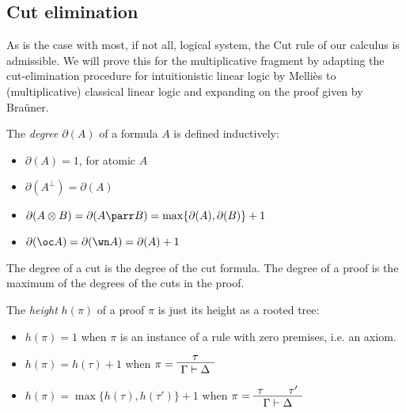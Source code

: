 \documentclass[DIN, pagenumber=false, fontsize=11pt, parskip=half, colorinlistoftodos, svgnames]{scrartcl}
\newcommand{\formatnote}[2][]{\todo[color=cyan!40, #1]{#2}}
\begin{document}
	\formatnote{proofsymbol なんで？ :( }
	
	
	
	\subsection{Cut elimination }
	\label{cut-elimination}
	
	As is the case with most, if not all, logical system, the Cut rule of our calculus is admissible. We will prove this for the multiplicative fragment by adapting the cut-elimination procedure for intuitionistic linear logic by 
	Melliès to (multiplicative) classical linear logic and expanding on the proof given by Braüner\cite{brauner}.
	
	
	\begin{definition}[Degree]
		The \emph{degree} $\partial(A)$ of a formula $A$ is defined inductively:
		\begin{itemize}
			\item $\partial(A) = 1$, for atomic $A$ 
			\item $\partial \left(A^\bot\right) = \partial(A)$ 
			\item $\partial(A \otimes B) = \partial(A \parr B) = \max\{\partial(A), \partial(B)\} + 1$
			\item $\partial(\oc A ) = \partial(\wn A) = \partial(A) + 1$
		\end{itemize} 
		The degree of a cut is the degree of the cut formula. The degree of a proof is the maximum of the degrees of the cuts in the proof. 
	\end{definition}
	
	
	
	
	
	\begin{definition}[Height]
		The \emph{height} $h(\pi)$ of a proof $\pi$ is just its height as a rooted tree: 
		\begin{itemize}
			\item $h(\pi) = 1$ when $\pi$ is an instance of a rule with zero premises, i.e. an axiom.
			\item $h(\pi) = h(\tau) +1$ when $\pi = \AxiomC{$\tau$} \UnaryInfC{$\Gamma \vdash \Delta$} \DisplayProof$
			\item $h(\pi) = \max\{h(\tau), h(\tau')\} + 1$ when $\pi = \AxiomC{$\tau$} \AxiomC{$\tau'$} \BinaryInfC{$\Gamma \vdash \Delta$} \DisplayProof$
		\end{itemize}
	\end{definition}
	
\end{document}
